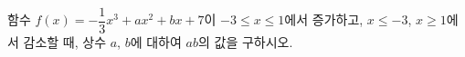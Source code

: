 함수 $f(x)=-\dfrac{1}{3}x^3+ax^2+bx+7$이 $-3\le x\le 1$에서 증가하고, $x\le -3$, $x\ge 1$에서 감소할 때, 상수 $a$, $b$에 대하여 $ab$의 값을 구하시오.
